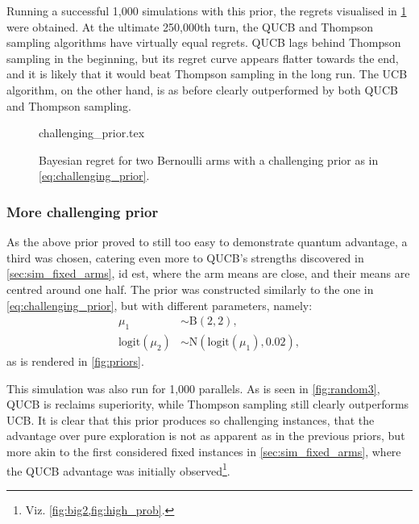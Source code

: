 Running a successful 1,000 simulations with this prior, the regrets visualised in \cref{fig:random2} were obtained.
At the ultimate 250,000th turn, the QUCB and Thompson sampling algorithms have virtually equal regrets.
QUCB lags behind Thompson sampling in the beginning, but its regret curve appears flatter towards the end, and it is likely that it would beat Thompson sampling in the long run.
The UCB algorithm, on the other hand, is as before clearly outperformed by both QUCB and Thompson sampling.

\begin{figure}[p]
    \centering
    \newcommand{\myoptions}{
        width=10cm,
        height=8cm,
        xlabel={Kiloturn},
        ylabel={Regret},
        legend entries={UCB, QUCB, Thompson},
        legend pos=north west,
        legend cell align=left,
        mystyle,
        ymax = 400,
    }
    {challenging_prior.tex}
    \caption[
        Bayesian regret for two Bernoulli arms, challenging prior.
    ]
    {
        Bayesian regret for two Bernoulli arms with a challenging prior as in \cref{eq:challenging_prior}.
    }
    \label{fig:random2}
\end{figure}

\subsubsection{More challenging prior}
As the above prior proved to still too easy to demonstrate quantum advantage, a third was chosen, catering even more to QUCB's strengths discovered in \cref{sec:sim_fixed_arms}, id est, where the arm means are close, and their means are centred around one half.
The prior was constructed similarly to the one in \cref{eq:challenging_prior}, but with different parameters, namely:
\begin{equation}
    \label{eq:more_challenging_prior}
    \begin{aligned}
        \mu_1               & \sim \text{B}(2, 2),                      \\
        \text{logit}(\mu_2) & \sim \text{N}(\text{logit}(\mu_1), 0.02),
    \end{aligned}
\end{equation}
as is rendered in \cref{fig:priors}.

This simulation was also run for 1,000 parallels.
As is seen in \cref{fig:random3}, QUCB is reclaims superiority, while Thompson sampling still clearly outperforms UCB.
It is clear that this prior produces so challenging instances, that the advantage over pure exploration is not as apparent as in the previous priors, but more akin to the first considered fixed instances in \cref{sec:sim_fixed_arms}, where the QUCB advantage was initially observed\footnote{Viz. \cref{fig:big2,fig:high_prob}.}.




